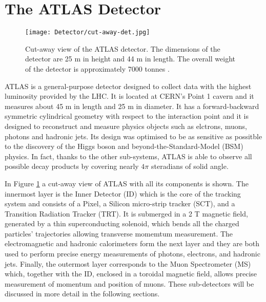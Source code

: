 	\section{The ATLAS Detector}
	\label{sec:det}

		\begin{figure}[!htb]
			\texttt{[image: Detector/cut-away-det.jpg]}
			\caption{Cut-away view of the ATLAS detector. The dimensions of the detector are 25 m in height and 44 m in length. The overall weight of the detector is approximately 7000 tonnes \cite{Lefevre2008}.}
			\label{fig:cut-away-det}
		\end{figure}


		ATLAS is a general-purpose detector designed to collect data with the highest luminosity provided by the LHC. It is located at CERN's Point 1 cavern and it measures about 45 m in length and 25 m in diameter. It has a forward-backward symmetric cylindrical geometry with respect to the interaction point and it is designed to reconstruct and measure physics objects such as elctrons, muons, photons and hadronic jets. Its design was optimised to be as sensitive as possitble to the discovery of the Higgs boson and beyond-the-Standard-Model (BSM) physics. In fact, thanks to the other sub-systems, ATLAS is able to observe all possible decay products by covering nearly $4\pi$ steradians of solid angle.

		In Figure \ref{fig:cut-away-det} a cut-away view of ATLAS with all its components is shown. The innermost layer is the Inner Detector (ID) which is the core of the tracking system and consists of a Pixel, a Silicon micro-strip tracker (SCT), and a Transition Radiation Tracker (TRT). It is submerged in a 2 T magnetic field, generated by a thin superconducting solenoid, which bends all the charged particles' trajectories allowing transverse momemtum measurement. The electromagnetic and hadronic calorimeters form the next layer and they are both used to perform precise energy measurements of photons, electrons, and hadronic jets. Finally, the outermost layer corresponds to the Muon Spectrometer (MS) which, together with the ID, enclosed in a toroidal magnetic field, allows precise measurement of momentum and position of muons. These sub-detectors will be discussed in more detail in the following sections. 
	

